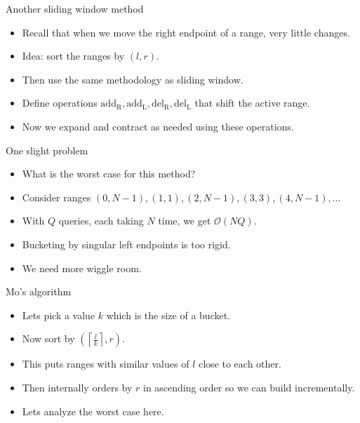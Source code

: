 \documentclass{beamer}
\begin{document}
\begin{frame}[plain]{Another sliding window method}
    \begin{itemize}
        \item Recall that when we move the right endpoint of a range, very little changes.
        \item Idea: sort the ranges by $(l, r)$.
        \item Then use the same methodology as sliding window.
        \item Define operations $\mathrm{add_R}, \mathrm{add_L}, \mathrm{del_R}, \mathrm{del_L}$ that shift the active range.
        \item Now we expand and contract as needed using these operations.
    \end{itemize}
\end{frame}

\begin{frame}[plain]{One slight problem}
    \begin{itemize}
        \item<1-> What is the worst case for this method?
        \item<2-> Consider ranges $(0, N-1), (1, 1), (2, N-1), (3, 3), (4, N-1), \dots$
        \item<3-> With $Q$ queries, each taking $N$ time, we get $\mathcal{O}(NQ)$.
        \item<3-> Bucketing by singular left endpoints is too rigid.
        \item<3-> We need more wiggle room.
    \end{itemize}
\end{frame}

\begin{frame}[plain]{Mo's algorithm}
    \begin{itemize}
        \item Lets pick a value $k$ which is the size of a bucket.
        \item Now sort by $(\left\lceil\frac{l}{k}\right\rceil, r)$.
        \item This puts ranges with similar values of $l$ close to each other.
        \item Then internally orders by $r$ in ascending order so we can build incrementally.
        \item Lets analyze the worst case here.
    \end{itemize}
\end{frame}
\end{document}
